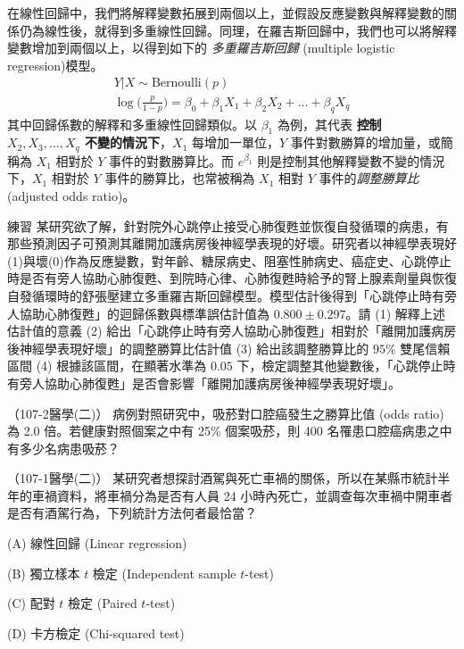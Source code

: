     在線性回歸中，我們將解釋變數拓展到兩個以上，並假設反應變數與解釋變數的關係仍為線性後，就得到多重線性回歸。同理，在羅吉斯回歸中，我們也可以將解釋變數增加到兩個以上，以得到如下的 \textit{多重羅吉斯回歸} (multiple logistic regression)模型。
    \begin{gather*}
        Y|X \sim \text{Bernoulli}(p)\\
        \log\Big(\frac{p}{1-p}\Big) = \beta_0 + \beta_1 X_1 + \beta_2 X_2 + ... + \beta_q X_q
    \end{gather*}
    其中回歸係數的解釋和多重線性回歸類似。以 $\beta_1$ 為例，其代表 \textbf{控制 $X_2, X_3,...,X_q$ 不變的情況下}，$X_1$ 每增加一單位，$Y$ 事件對數勝算的增加量，或簡稱為 $X_1$ 相對於 $Y$ 事件的對數勝算比。而 $e^{\beta_1}$ 則是控制其他解釋變數不變的情況下，$X_1$ 相對於 $Y$ 事件的勝算比，也常被稱為 $X_1$ 相對 $Y$ 事件的\textit{調整勝算比} (adjusted odds ratio)。

    \bigskip

    \begin{custom}{練習}
        某研究欲了解，針對院外心跳停止接受心肺復甦並恢復自發循環的病患，有那些預測因子可預測其離開加護病房後神經學表現的好壞。研究者以神經學表現好(1)與壞(0)作為反應變數，對年齡、糖尿病史、阻塞性肺病史、癌症史、心跳停止時是否有旁人協助心肺復甦、到院時心律、心肺復甦時給予的腎上腺素劑量與恢復自發循環時的舒張壓建立多重羅吉斯回歸模型。模型估計後得到「心跳停止時有旁人協助心肺復甦」的迴歸係數與標準誤估計值為 $0.800 \pm 0.297$。請 (1) 解釋上述估計值的意義 (2) 給出「心跳停止時有旁人協助心肺復甦」相對於「離開加護病房後神經學表現好壞」的調整勝算比估計值 (3) 給出該調整勝算比的 $95\%$ 雙尾信賴區間 (4) 根據該區間，在顯著水準為 $0.05$ 下，檢定調整其他變數後，「心跳停止時有旁人協助心肺復甦」是否會影響「離開加護病房後神經學表現好壞」。
    \end{custom}
    
    \begin{docexam}{（107-2醫學(二)）}
        病例對照研究中，吸菸對口腔癌發生之勝算比值 (odds ratio) 為 2.0 倍。若健康對照個案之中有 25\% 個案吸菸，則 400 名罹患口腔癌病患之中有多少名病患吸菸？
    \end{docexam}
    
    \begin{docexam}{（107-1醫學(二)）}
        某研究者想探討酒駕與死亡車禍的關係，所以在某縣市統計半年的車禍資料，將車禍分為是否有人員 24 小時內死亡，並調查每次車禍中開車者是否有酒駕行為，下列統計方法何者最恰當？

        (A) 線性回歸 (Linear regression)
        
        (B) 獨立樣本 $t$ 檢定 (Independent sample $t$-test)

        (C) 配對 $t$ 檢定 (Paired $t$-test)
 
        (D) 卡方檢定 (Chi-squared test)
    \end{docexam}
    
